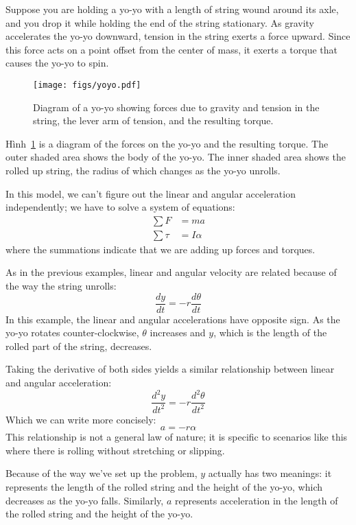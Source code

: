 \documentclass[12pt]{book}
\theoremstyle{exercise}
\begin{document}
Suppose you are holding a yo-yo with a length of string wound around its axle, and you drop it while holding the end of the string stationary.  As gravity accelerates the yo-yo downward, tension in the string exerts a force upward.  Since this force acts on a point offset from the center of mass, it exerts a torque that causes the yo-yo to spin.


\begin{figure}
\centerline{\texttt{[image: figs/yoyo.pdf]}}
\caption{Diagram of a yo-yo showing forces due to gravity and tension in the string, the lever arm of tension, and the resulting torque.}
\label{yoyo}
\end{figure}

Hình~\ref{yoyo} is a diagram of the forces on the yo-yo and the resulting torque.  The outer shaded area shows the body of the yo-yo.  The inner shaded area shows the rolled up string, the radius of which changes as the yo-yo unrolls.


In this model, we can't figure out the linear and angular acceleration independently; we have to solve a system of equations:
%
\begin{align*}
\sum F &= m a \\
\sum \tau &= I \alpha
\end{align*}
%
where the summations indicate that we are adding up forces and torques.

As in the previous examples, linear and angular velocity are related because of the way the string unrolls:
%
\[ \frac{dy}{dt} = -r \frac{d \theta}{dt} \]
%
In this example, the linear and angular accelerations have opposite sign.  As the yo-yo rotates counter-clockwise, $\theta$ increases and $y$, which is the length of the rolled part of the string, decreases.

Taking the derivative of both sides yields a similar relationship between linear and angular acceleration:
%
\[ \frac{d^2 y}{dt^2} = -r \frac{d^2 \theta}{dt^2} \]
%
Which we can write more concisely:
%
\[ a = -r \alpha \]
%
This relationship is not a general law of nature; it is specific to scenarios like this where there is rolling without stretching or slipping.


Because of the way we've set up the problem, $y$ actually has two meanings: it represents the length of the rolled string and the height of the yo-yo, which decreases as the yo-yo falls.  Similarly, $a$ represents acceleration in the length of the rolled string and the height of the yo-yo.
\end{document}
